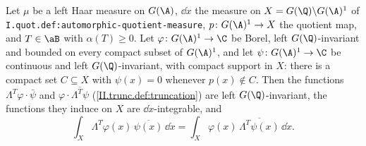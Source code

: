 Let $\mu$ be a left Haar measure on $G(\A)$, $\dd\dot x$ the measure on $X=G(\Q)\backslash G(\A)^1$ of \texttt{I.quot.def:automorphic-quotient-measure}, $p\colon G(\A)^1\to X$ the
quotient map, and $T\in\aB$ with $\alpha(T)\ge0$. Let $\varphi\colon G(\A)^1\to\C$ be Borel, left $G(\Q)$-invariant and bounded on every compact subset of $G(\A)^1$, and let
$\psi\colon G(\A)^1\to\C$ be continuous and left $G(\Q)$-invariant, with compact support in $X$: there is a compact set $C\subseteq X$ with $\psi(x)=0$ whenever $p(x)\notin C$.
Then the functions $\Lambda^T\varphi\cdot\bar\psi$ and $\varphi\cdot\overline{\Lambda^T\psi}$ (\cref{II.trunc.def:truncation}) are left $G(\Q)$-invariant, the functions they
induce on $X$ are $\dd\dot x$-integrable, and
\[
  \int_X\Lambda^T\varphi(x)\,\overline{\psi(x)}\,\dd\dot x=\int_X\varphi(x)\,\overline{\Lambda^T\psi(x)}\,\dd\dot x .
\]
